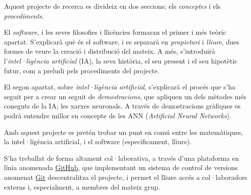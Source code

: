 Aquest projecte de recerca es divideix en dos seccions; els \emph{conceptes}
i els \emph{procediments}.

El \emph{software}, i les seves filosofies i llicències formaran el primer i més
teòric apartat. S'explicarà què és el software, i es separarà en \emph{propietari}
i \emph{lliure}, dues formes de veure la creació i distribució del mateix. A més,
s'introduirà l'\emph{intel·ligència artificial} (IA), la seva història, el seu present i el
seu hipotètic futur, com a preludi pels procediments del projecte.

El segon apartat, sobre \emph{intel·ligència artificial}, s'explicarà el procés
que s'ha seguit per a crear un seguit de \emph{demostracions}, que apliquen un
dels mètodes més coneguts de la IA; les xarxes neuronals. A través de demostracions
gràfiques es podrà entendre millor en concepte de les ANN (\emph{Artificial Neural Networks}).

Amb aquest projecte es pretén trobar un punt en comú entre les matemàtiques,
la intel·ligència artificial, i el software (específicament, lliure).

S'ha treballat de forma altament col·laborativa, a través d'una plataforma
en línia anomenada \href{http://github.com}{GitHub}, que implementant un sistema
de control de versions anomenat \href{http://git-scm.com/}{Git} descentralitza
el projecte, i permet el lliure accés a col·laboradors externs i, especialment, a membres
del mateix grup.